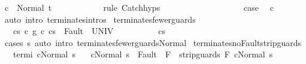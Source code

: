 \begin{isabellebody}
\ {\isachardoublequoteopen}{\isasymGamma}{\isasymturnstile}c{}\ {\isasymdown}\ Normal\ t{\isachardoublequoteclose}\isanewline
\ \ \ \ \ \ \ \ \ \ \isamarkupfalse%
\ {\isacharparenleft}rule\ Catch{\isachardot}hyps{\isacharparenright}\isanewline
\ \ \ \ \ \ \isamarkupfalse%
\isanewline
\ \ \ \ \isamarkupfalse%
\isanewline
\ \ \isacommand{{\isacharbraceright}}\isamarkupfalse%
\isanewline
\ \ \isamarkupfalse%
\ \isamarkupfalse%
\ {\isacharquery}case\ \isamarkupfalse%
\ c\ \isamarkupfalse%
\ {\isacharparenleft}auto\ intro{\isacharcolon}\ terminates{\isachardot}intros{\isacharparenright}\isanewline
{}\isamarkupfalse%
%
\endisatagproof
{\isafoldproof}%
%
\isadelimproof
\isanewline
%
\endisadelimproof
\isanewline
{}\isamarkupfalse%
\ terminates{\isacharunderscore}fewer{\isacharunderscore}guards{\isacharcolon}\isanewline
\ \ \ {\isachardoublequoteopen}{\isasymlbrakk}{\isasymGamma}{\isasymturnstile}c{\isacharprime}{\isasymdown}s{\isacharsemicolon}\ c\ {\isasymsubseteq}\isactrlsub g\ c{\isacharprime}{\isacharsemicolon}\ {\isasymGamma}{\isasymturnstile}{\isasymlangle}c{\isacharprime}{\isacharcomma}s\ {\isasymrangle}\ {\isasymRightarrow}{\isasymnotin}Fault\ {\isacharbackquote}\ UNIV{\isasymrbrakk}\isanewline
\ \ \ \ \ \ \ \ \ {\isasymLongrightarrow}\ {\isasymGamma}{\isasymturnstile}c{\isasymdown}s{\isachardoublequoteclose}\isanewline
%
\isadelimproof
\ \ %
\endisadelimproof
%
\isatagproof
{}\isamarkupfalse%
\ {\isacharparenleft}cases\ s{\isacharparenright}\ {\isacharparenleft}auto\ intro{\isacharcolon}\ terminates{\isacharunderscore}fewer{\isacharunderscore}guards{\isacharunderscore}Normal{\isacharparenright}%
\endisatagproof
{\isafoldproof}%
%
\isadelimproof
\isanewline
%
\endisadelimproof
\isanewline
{}\isamarkupfalse%
\ terminates{\isacharunderscore}noFault{\isacharunderscore}strip{\isacharunderscore}guards{\isacharcolon}\isanewline
\ \ \ termi{\isacharcolon}\ {\isachardoublequoteopen}{\isasymGamma}{\isasymturnstile}c{\isasymdown}Normal\ s{\isachardoublequoteclose}\isanewline
\ \ \ {\isachardoublequoteopen}{\isasymlbrakk}{\isasymGamma}{\isasymturnstile}{\isasymlangle}c{\isacharcomma}Normal\ s\ {\isasymrangle}\ {\isasymRightarrow}{\isasymnotin}Fault\ {\isacharbackquote}\ F{\isasymrbrakk}\ {\isasymLongrightarrow}\ {\isasymGamma}{\isasymturnstile}strip{\isacharunderscore}guards\ F\ c{\isasymdown}Normal\ s{\isachardoublequoteclose}\isanewline

\end{isabellebody}
